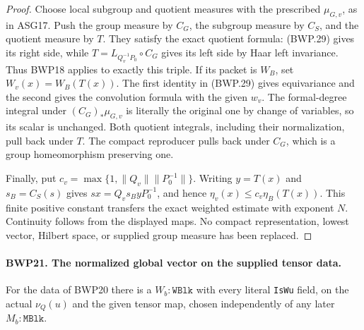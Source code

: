 \documentclass[11pt,a4paper]{article}
\numberwithin{equation}{section}
\theoremstyle{remark}\newtheorem{remark}[theorem]{Remark}
\begin{document}
\begin{proof}
Choose local subgroup and quotient measures with the prescribed
\(\mu_{G,v}\), as in ASG17.  Push the group measure by \(C_G\),
the subgroup measure by \(C_S\), and the quotient measure by \(T\).
They satisfy the exact quotient formula: (BWP.29) gives its right
side, while \(T=L_{Q_v^{-1}P_0}\circ C_G\) gives its left side
by Haar left invariance.  Thus BWP18 applies to exactly this triple.
If its packet is \(W_B\), set \(W_v(x)=W_B(T(x))\).
The first identity in (BWP.29) gives equivariance and the second gives
the convolution formula with the given \(w_v\).  The formal-degree
integral under \((C_G)_*\mu_{G,v}\) is literally the original
one by change of variables, so its scalar is unchanged.
Both quotient integrals, including their normalization, pull back
under \(T\).  The compact reproducer pulls back under \(C_G\),
which is a group homeomorphism preserving one.

Finally, put \(c_v=\max\{1,\|Q_v\|\|P_0^{-1}\|\}\).
Writing \(y=T(x)\) and \(s_B=C_S(s)\) gives
\(sx=Q_vs_ByP_0^{-1}\), and hence
\(\eta_v(x)\le c_v\eta_B(T(x))\).
This finite positive constant transfers the exact weighted estimate
with exponent \(N\).  Continuity follows from the displayed maps.
No compact representation, lowest vector, Hilbert space, or supplied
group measure has been replaced.
\end{proof}

\paragraph{BWP21. The normalized global vector on the supplied tensor data.}
\label{claim:BWP21}
For the data of BWP20 there is a \(W_b:\texttt{WBlk}\) with
every literal \texttt{Is\allowbreak Wu} field, on the actual \(\nu_Q(u)\)
and the given tensor map, chosen independently of any later
\(M_b:\texttt{MBlk}\).
\end{document}
